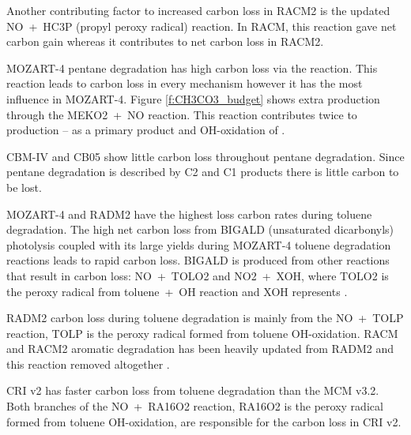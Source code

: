 Another contributing factor to increased carbon loss in RACM2 is the updated \mbox{NO + HC3P} (propyl peroxy radical) reaction.
In RACM, this reaction gave net carbon gain whereas it contributes to net carbon loss in RACM2.

MOZART-4 pentane degradation has high carbon loss via the  reaction.
This reaction leads to carbon loss in every mechanism however it has the most influence in MOZART-4. 
Figure \ref{f:CH3CO3_budget} shows extra  production through the \mbox{MEKO2 + NO} reaction.
This reaction contributes twice to  production -- as a primary product and OH-oxidation of .

CBM-IV and CB05 show little carbon loss throughout pentane degradation.
Since pentane degradation is described by C2 and C1 products there is little carbon to be lost.

MOZART-4 and RADM2 have the highest loss carbon rates during toluene degradation.
The high net carbon loss from BIGALD (unsaturated dicarbonyls) photolysis coupled with its large yields during MOZART-4 toluene degradation reactions leads to rapid carbon loss.
BIGALD is produced from other reactions that result in carbon loss: \mbox{NO + TOLO2} and \mbox{NO2 + XOH}, where TOLO2 is the peroxy radical from \mbox{toluene + OH} reaction and XOH represents  \citep{Emmons:2010}.

RADM2 carbon loss during toluene degradation is mainly from the \mbox{NO + TOLP} reaction, TOLP is the peroxy radical formed from toluene OH-oxidation.
RACM and RACM2 aromatic degradation has been heavily updated from RADM2 and this reaction removed altogether \citep{Stockwell:1997, Goliff:2013}.

CRI v2 has faster carbon loss from toluene degradation than the MCM v3.2.
Both branches of the \mbox{NO + RA16O2} reaction, RA16O2 is the peroxy radical formed from toluene OH-oxidation, are responsible for the carbon loss in CRI v2.

